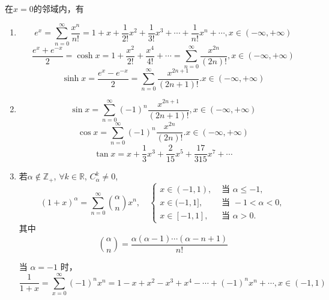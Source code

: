 在$x=0$的邻域内，有
\begin{enumerate}
	\item \[
	e^x =\sum_{n = 0}^{\infty}\frac{x^n}{n!}= 1 + x + \frac{1}{2!}x^2 + \frac{1}{3!}x^3 + \cdots + \frac{1}{n!}x^n +\cdots 
	,x\in(-\infty,+\infty)\]
	\[
	\frac{e^x+e^{-x}}{2}=\cosh x
	=1+\frac{x^2}{2!}+\frac{x^4}{4!}+\cdots
	=\sum_{n=0}^{\infty}\frac{x^{2n}}{(2n)!},x\in(-\infty,+\infty)
	\]
	\[
	\sinh x=\frac{e^x-e^{-x}}{2}
	=\sum_{n=0}^{\infty}\frac{x^{2n+1}}{(2n+1)!}.x\in(-\infty,+\infty)
	\]
	\item \[
	\sin x=\sum_{n=0}^{\infty}(-1)^n\frac{x^{2n+1}}{(2n+1)!},x\in(-\infty,+\infty)
	\]
	\[
	\cos x=\sum_{n=0}^{\infty}(-1)^n\frac{x^{2n}}{(2n)!}.x\in(-\infty,+\infty)
	\]
	\[
	\tan x = x + \frac{1}{3}x^3 + \frac{2}{15}x^5 + \frac{17}{315}x^7 + \cdots
	\]
	\item 
	若$ \alpha \notin \mathbb{Z}_+$, $\forall k \in \mathbb{R}$, $C_\alpha^k \neq 0$,
	\[(1+x)^\alpha=\sum_{n=0}^{\infty}\binom{\alpha}{n} x^n, \quad \begin{cases}x \in(-1,1), & \text { 当 } \alpha \leqslant-1, \\ x \in(-1,1], & \text { 当 }-1<\alpha<0, \\ x \in[-1,1], & \text { 当 } \alpha>0 .\end{cases}\]	
	其中\[\binom{\alpha}{n}=\frac{\alpha(\alpha-1)\cdots(\alpha-n+1)}{n!}\]
	
	当 $\alpha = -1$ 时，
	\[
	\frac{1}{1+x} =\sum_{x=0}^{\infty}(-1)^nx^n= 1 - x + x^2 - x^3 + x^4 - \cdots + (-1)^n x^n +\cdots
	,x\in(-1,1)\]
	

\end{enumerate}
